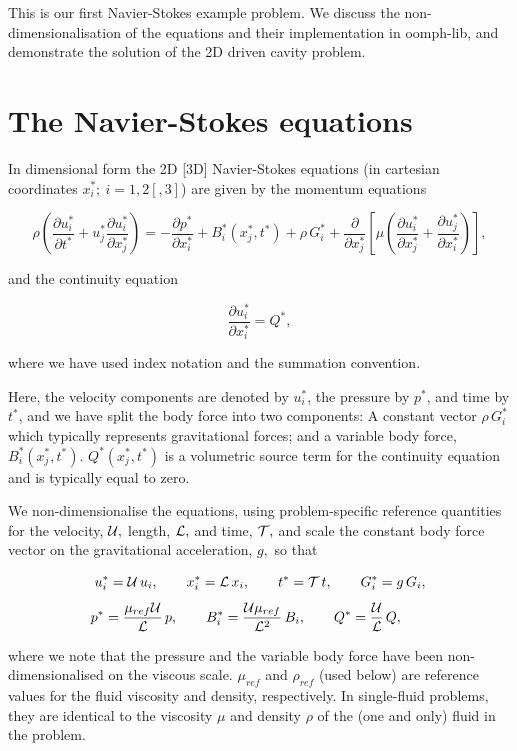 This is our first Navier-\/\+Stokes example problem. We discuss the non-\/dimensionalisation of the equations and their implementation in {\ttfamily oomph-\/lib}, and demonstrate the solution of the 2D driven cavity problem.



 

\hypertarget{index_equation}{}\section{The Navier-\/\+Stokes equations}\label{index_equation}
In dimensional form the 2D \mbox{[}3D\mbox{]} Navier-\/\+Stokes equations (in cartesian coordinates $ x_i^*; \ i=1,2 [,3] $) are given by the momentum equations \begin{center} \[ \rho\left(\frac{\partial u_i^*}{\partial t^*} + u_j^*\frac{\partial u_i^*}{\partial x_j^*}\right) = - \frac{\partial p^*}{\partial x_i^*} + B_i^*(x_j^*,t^*) + \rho \, G^*_i + \frac{\partial }{\partial x_j^*} \left[ \mu\left( \frac{\partial u_i^*}{\partial x_j^*} + \frac{\partial u_j^*}{\partial x_i^*} \right) \right], \] \end{center}  and the continuity equation \begin{center} \[ \frac{\partial u_i^*}{\partial x_i^*} = Q^*, \] \end{center}  where we have used index notation and the summation convention.

Here, the velocity components are denoted by $ u_i^* $, the pressure by $ p^* $, and time by $ t^* $, and we have split the body force into two components\+: A constant vector $ \rho \, G_i^* $ which typically represents gravitational forces; and a variable body force, $ B_i^*(x^*_j,t^*) $. $ Q^*(x^*_j,t^*) $ is a volumetric source term for the continuity equation and is typically equal to zero.

We non-\/dimensionalise the equations, using problem-\/specific reference quantities for the velocity, $ {\cal U},$ length, $ {\cal L}, $ and time, ${\cal T},$ and scale the constant body force vector on the gravitational acceleration, $g, $ so that \begin{center} \[ u_i^* = {\cal U} \, u_i, \qquad x_i^* = {\cal L}\, x_i, \qquad t^* = {\cal T}\, t, \qquad G_i^* = g \, G_i, \] \[ p^* = \frac{\mu_{ref} {\cal U}}{{\cal L}} \, p, \qquad B_i^* = \frac{{\cal U}\mu_{ref}}{{\cal L}^2} \, B_i, \qquad Q^* = \frac{{\cal U}}{{\cal L}}\, Q, \qquad \] \end{center}  where we note that the pressure and the variable body force have been non-\/dimensionalised on the viscous scale. $ \mu_{ref} $ and $ \rho_{ref} $ (used below) are reference values for the fluid viscosity and density, respectively. In single-\/fluid problems, they are identical to the viscosity $ \mu $ and density $ \rho $ of the (one and only) fluid in the problem.

